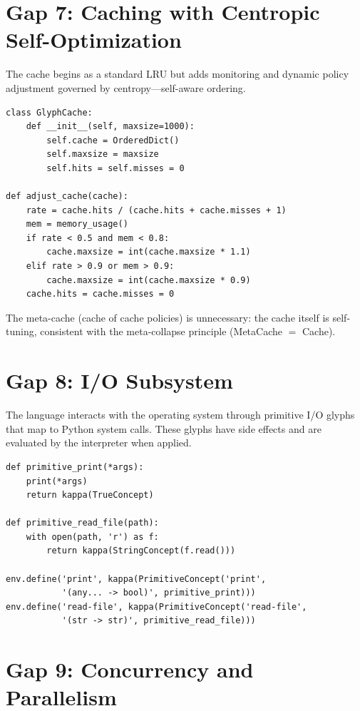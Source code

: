 \documentclass[12pt, letterpaper]{book}
\def\equiv{=}%
\begin{document}
\section{Gap 7: Caching with Centropic Self-Optimization}

The cache begins as a standard LRU but adds monitoring and dynamic policy adjustment governed by centropy---self-aware ordering.

\begin{verbatim}
class GlyphCache:
    def __init__(self, maxsize=1000):
        self.cache = OrderedDict()
        self.maxsize = maxsize
        self.hits = self.misses = 0

def adjust_cache(cache):
    rate = cache.hits / (cache.hits + cache.misses + 1)
    mem = memory_usage()
    if rate < 0.5 and mem < 0.8:
        cache.maxsize = int(cache.maxsize * 1.1)
    elif rate > 0.9 or mem > 0.9:
        cache.maxsize = int(cache.maxsize * 0.9)
    cache.hits = cache.misses = 0
\end{verbatim}

The meta-cache (cache of cache policies) is unnecessary: the cache itself is self-tuning, consistent with the meta-collapse principle (MetaCache $\equiv$ Cache).

\section{Gap 8: I/O Subsystem}

The language interacts with the operating system through primitive I/O glyphs that map to Python system calls. These glyphs have side effects and are evaluated by the interpreter when applied.

\begin{verbatim}
def primitive_print(*args):
    print(*args)
    return kappa(TrueConcept)

def primitive_read_file(path):
    with open(path, 'r') as f:
        return kappa(StringConcept(f.read()))

env.define('print', kappa(PrimitiveConcept('print',
           '(any... -> bool)', primitive_print)))
env.define('read-file', kappa(PrimitiveConcept('read-file',
           '(str -> str)', primitive_read_file)))
\end{verbatim}

\section{Gap 9: Concurrency and Parallelism}
\end{document}
